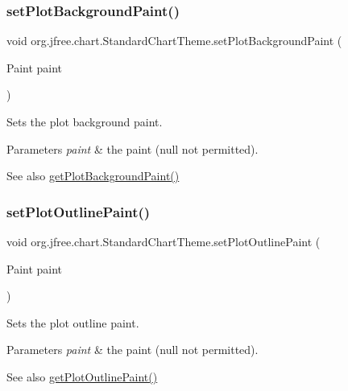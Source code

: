 \subsubsection{\texorpdfstring{set\+Plot\+Background\+Paint()}{setPlotBackgroundPaint()}}
{\footnotesize\ttfamily void org.\+jfree.\+chart.\+Standard\+Chart\+Theme.\+set\+Plot\+Background\+Paint (\begin{DoxyParamCaption}\item[{Paint}]{paint }\end{DoxyParamCaption})}

Sets the plot background paint.


\begin{DoxyParams}{Parameters}
{\em paint} & the paint ({\ttfamily null} not permitted).\\
\hline
\end{DoxyParams}
\begin{DoxySeeAlso}{See also}
\mbox{\hyperlink{classorg_1_1jfree_1_1chart_1_1_standard_chart_theme_a2aa18220fcadb8ebd8f099644ea2ef2d}{get\+Plot\+Background\+Paint()}} 
\end{DoxySeeAlso}
\mbox{\label{classorg_1_1jfree_1_1chart_1_1_standard_chart_theme_abb2cb7117ac0684e201aa370e1589332}} 
\subsubsection{\texorpdfstring{set\+Plot\+Outline\+Paint()}{setPlotOutlinePaint()}}
{\footnotesize\ttfamily void org.\+jfree.\+chart.\+Standard\+Chart\+Theme.\+set\+Plot\+Outline\+Paint (\begin{DoxyParamCaption}\item[{Paint}]{paint }\end{DoxyParamCaption})}

Sets the plot outline paint.


\begin{DoxyParams}{Parameters}
{\em paint} & the paint ({\ttfamily null} not permitted).\\
\hline
\end{DoxyParams}
\begin{DoxySeeAlso}{See also}
\mbox{\hyperlink{classorg_1_1jfree_1_1chart_1_1_standard_chart_theme_a86705dd536633d55d7451feb16e589ee}{get\+Plot\+Outline\+Paint()}} 
\end{DoxySeeAlso}
\mbox{\label{classorg_1_1jfree_1_1chart_1_1_standard_chart_theme_a86328e314e2d0195033b5cae639f141f}} 
